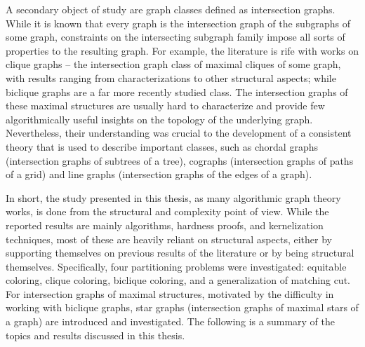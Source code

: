 A secondary object of study are graph classes defined as intersection graphs.
While it is known that every graph is the intersection graph of the subgraphs of some graph, constraints on the intersecting subgraph family impose all sorts of properties to the resulting graph.
For example, the literature is rife with works on clique graphs -- the intersection graph class of maximal cliques of some graph, with results ranging from characterizations to other structural aspects; while biclique graphs are a far more recently studied class.
The intersection graphs of these maximal structures are usually hard to characterize and provide few algorithmically useful insights on the topology of the underlying graph.
Nevertheless, their understanding was crucial to the development of a consistent theory that is used to describe important classes, such as chordal graphs (intersection graphs of subtrees of a tree), cographs (intersection graphs of paths of a grid) and line graphs (intersection graphs of the edges of a graph).

In short, the study presented in this thesis, as many algorithmic graph theory works, is done from the structural and complexity point of view.
While the reported results are mainly algorithms, hardness proofs, and kernelization techniques, most of these are heavily reliant on structural aspects, either by supporting themselves on previous results of the literature or by being structural themselves.
Specifically, four partitioning problems were investigated: equitable coloring, clique coloring, biclique coloring, and a generalization of matching cut.
For intersection graphs of maximal structures, motivated by the difficulty in working with biclique graphs, star graphs (intersection graphs of maximal stars of a graph) are introduced and investigated.
The following is a summary of the topics and results discussed in this thesis.

